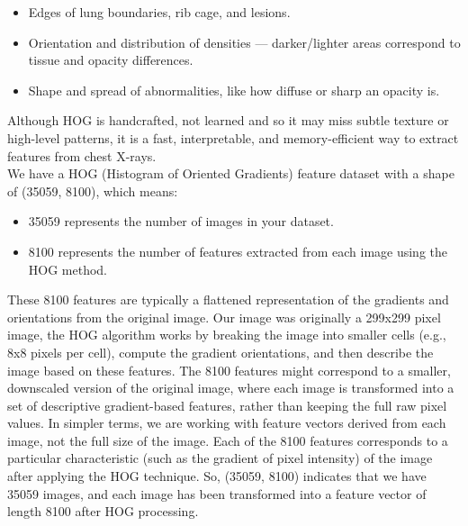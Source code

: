 \documentclass{article}
\begin{document}
\begin{itemize}
     \item Edges of lung boundaries, rib cage, and lesions.
     \item Orientation and distribution of densities — darker/lighter areas correspond to tissue and opacity differences.
     \item Shape and spread of abnormalities, like how diffuse or sharp an opacity is.
\end{itemize}
Although HOG is handcrafted, not learned  and  so it may miss subtle texture or high-level patterns, it is a fast, interpretable, and memory-efficient way to extract features from chest X-rays. \\
We have a HOG (Histogram of Oriented Gradients) feature dataset with a shape of (35059, 8100), which means:
\begin{itemize}
    \item 35059 represents the number of images in your dataset.
    \item 8100 represents the number of features extracted from each image using the HOG method.
\end{itemize}
	
These 8100 features are typically a flattened representation of the gradients and orientations from the original image. Our image was originally a 299x299 pixel image, the HOG algorithm works by breaking the image into smaller cells (e.g., 8x8 pixels per cell), compute the gradient orientations, and then describe the image based on these features.
The 8100 features might correspond to a smaller, downscaled version of the original image, where each image is transformed into a set of descriptive gradient-based features, rather than keeping the full raw pixel values.
In simpler terms, we are working with feature vectors derived from each image, not the full size of the image. Each of the 8100 features corresponds to a particular characteristic (such as the gradient of pixel intensity) of the image after applying the HOG technique.
So, (35059, 8100) indicates that we have 35059 images, and each image has been transformed into a feature vector of length 8100 after HOG processing.
\end{document}
